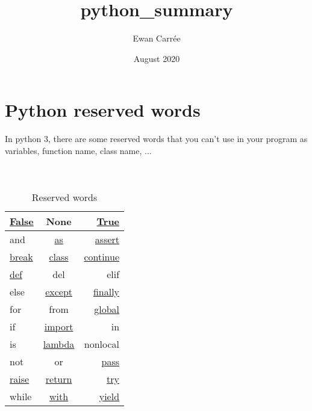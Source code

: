 \documentclass[a4paper, 12pt]{article}
\title{\textbf{python\_summary}}
\author{Ewan Carrée}
\date{August 2020}
\begin{document}
\maketitle
\newpage

\tableofcontents

\newpage
\section{Python reserved words}
In python 3, there are some reserved words that you can't use in your program as variables, function name, class name, ... \\ \\ \\

\begin{table}[h]
\begin{center}
{\renewcommand{\arraystretch}{2} %
{\setlength{\tabcolsep}{1.5cm} %
\begin{tabular}{|l|c|r|}
  \hline
  \hyperref[subsec:Bool]{False} & None & \hyperref[subsec:Bool]{True} \\
  \hline
  and & \hyperref[As]{as} & \hyperref[subsec:Assertion]{assert} \\
  \hline
  \hyperref[subsec:BCPR]{break} & \hyperref[sec:Class]{class} & \hyperref[subsec:BCPR]{continue} \\
  \hline
  \hyperref[sec:Function]{def} & del & elif \\
  \hline
  else & \hyperref[TEEF]{except} & \hyperref[TEEF]{finally} \\
  \hline
  for & from & \hyperref[subsec:Global]{global} \\
  \hline
  if & \hyperref[subsec:Import]{import} & in \\
  \hline
  is & \hyperref[subsec:Lambda]{lambda} & nonlocal \\
  \hline 
  not & or & \hyperref[subsec:BCPR]{pass} \\
  \hline 
  \hyperref[Raise]{raise} & \hyperref[subsec:BCPR]{return} & \hyperref[TEEF]{try} \\
  \hline
  while & \hyperref[subsec:ContextManager]{with} & \hyperref[sec:Generators]{yield} \\
  \hline
\end{tabular}}}
\end{center}
\caption{Reserved words}
\end{table}
\end{document}
